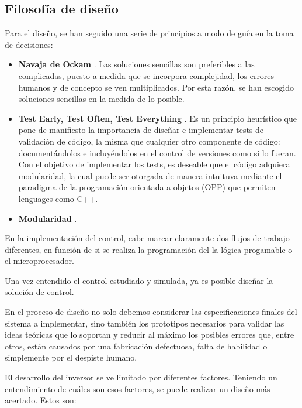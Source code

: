 \subsection{ Filosofía de diseño }

Para el diseño, se han seguido una serie de principios a modo de guía en la
toma de decisiones:

\begin{itemize}

    \item \textbf{ Navaja de Ockam }. Las soluciones sencillas son preferibles
    a las complicadas, puesto a medida que se incorpora complejidad, los
    errores humanos y de concepto se ven multiplicados. Por esta razón, se han
    escogido soluciones sencillas en la medida de lo posible.

    \item \textbf{ Test Early, Test Often, Test Everything }. Es un principio
    heurístico que pone de manifiesto la importancia de diseñar e implementar
    tests de validación de código, la misma que cualquier otro componente de
    código: documentándolos e incluyéndolos en el control de versiones como si
    lo fueran. Con el objetivo de implementar los tests, es deseable que el
    código adquiera modularidad, la cual puede ser otorgada de manera intuituva
    mediante el paradigma de la programación orientada a objetos (OPP) que
    permiten lenguages como C++.

    \item \textbf{ Modularidad }.

\end{itemize}

En la implementación del control, cabe marcar claramente dos flujos de trabajo
diferentes, en función de si se realiza la programación del la lógica
progamable o el microprocesador.

Una vez entendido el control estudiado y simulada, ya es posible diseñar la
solución de control.

En el proceso de diseño no solo debemos considerar las especificaciones finales
del sistema a implementar, sino también los prototipos necesarios para validar
las ideas teóricas que lo soportan y reducir al máximo los posibles errores
que, entre otros, están causados por una fabricación defectuosa, falta de
habilidad o simplemente por el despiste humano.

El desarrollo del inversor se ve limitado por diferentes factores. Teniendo un
entendimiento de cuáles son esos factores, se puede realizar un diseño más
acertado. Estos son:

